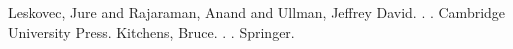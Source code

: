 \documentclass[10pt]{beamer}
\begin{document}
\begin{frame}
  \begin{thebibliography}{10}
      \beamertemplatebookbibitems
      Leskovec, Jure and Rajaraman, Anand and Ullman, Jeffrey David.
      .
      .
      \newblock Cambridge University Press.
      \beamertemplatearticlebibitems
        Kitchens, Bruce.
        .
        .
        \newblock Springer.
  \end{thebibliography}
\end{frame}
\end{document}
